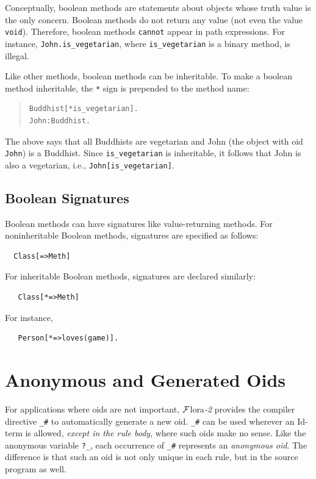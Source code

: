 \documentclass[11pt]{article}
\newcommand{\FLORA}{{\mbox{\sc ${\cal F}${lora}\rm\emph{-2}}}\xspace}
\begin{document}
Conceptually, boolean methods are statements about objects whose truth
value is the only concern. Boolean methods do not return any value (not
even the value {\tt void}). Therefore, boolean methods {\tt cannot} appear
in path expressions. For instance, \mbox{\tt John.is\_vegetarian}, where
{\tt is\_vegetarian} is a binary method, is illegal.

Like other methods, boolean methods can be inheritable. To make a
boolean method inheritable, the \verb|*| sign is prepended to
the method name:
\begin{quote}
\begin{verbatim}
Buddhist[*is_vegetarian].
John:Buddhist.
\end{verbatim}
\end{quote}
The above says that all Buddhists are vegetarian and John (the object with
oid {\tt John}) is a Buddhist. Since \verb|is_vegetarian| is inheritable,
it follows that John is also a vegetarian, i.e.,
\verb|John[is_vegetarian]|.

\subsection{Boolean Signatures}

Boolean methods can have signatures like value-returning methods.
For noninheritable Boolean methods, signatures are specified as follows:
\begin{verbatim}
  Class[=>Meth]
\end{verbatim}
For inheritable Boolean methods, signatures are declared similarly:
\begin{verbatim}
   Class[*=>Meth]
\end{verbatim}
For instance,
\begin{verbatim}
   Person[*=>loves(game)].
\end{verbatim}


\section{Anonymous and Generated Oids}\label{sec-anon-gen-oids}


%
For applications where oids are not important, \FLORA provides the
compiler directive \verb|_#| to automatically generate a new
oid. \verb|_#| can be used wherever an Id-term is allowed, \emph{except in the
rule body}, where such oids make no sense. Like the
anonymous variable \verb|?_|, each occurrence of \verb|_#| represents
an \emph{anonymous oid}. The difference is that such an oid is not only
unique in each rule, but in the source program as well.
\end{document}
